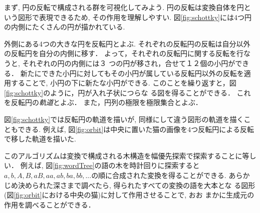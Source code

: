 まず, 円の反転で構成される群を可視化してみよう.
円の反転は変換自体を円という図形で表現できるため, その作用を理解しやすい.
図\ref{fig:schottky}には4つ円の内側にたくさんの円が描かれている.

外側にある4つの大きな円を反転円とよぶ.
それぞれの反転円の反転は自分以外の反転円を自分の内側に移す．
よって，それぞれの反転円に関する反転を行なうと, それぞれの円の内側には３
つの円が移され，合せて１２個の小円ができる．
新たにできた小円に対してもその小円が属している反転円以外の反転を適用することで, 小円の下に新たな小円ができる.
このことを繰り返すと，図\ref{fig:schottky}のように，円が入れ子状につらな
る図を得ることができる．
これを反転円の\emph{軌道}とよぶ．
また，円列の極限を極限集合とよぶ．

図\ref{fig:schottky}では反転円の軌道を描いが, 同様にして違う図形の軌道を描くこともできる.
例えば, 図\ref{fig:orbit}は中央に置いた猫の画像を4つ反転円による反転で移した軌道を描いた.

このアルゴリズムは変換で構成される木構造を幅優先探索で探索することに等しい．
例えば, 図\ref{fig:wordTree}の語の木を時計回りに探索すると$a, b, A, B,
aB, aa, ab, ba, bb, ...$の順に合成された変換を得ることができる.
あらかじめ決められた深さまで調べたら, 得られたすべての変換の語を大本とな
る図形(図\ref{fig:orbit}における中央の猫)に対して作用させることで, おお
まかに生成元の作用を調べることができる．

